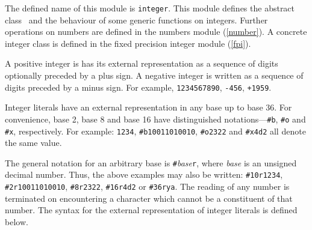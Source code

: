 \label{integer}
%
\begin{optDefinition}
The defined name of this module is {\tt integer}.  This module defines
the abstract class \ and the behaviour of some generic
functions on integers.  Further operations on numbers are defined in
the numbers module (\ref{number}).  A concrete integer class is
defined in the fixed precision integer module (\ref{fpi}).


A positive integer is has its
external representation as a sequence of digits optionally preceded by a plus
sign.  A negative integer is
written as a sequence of digits preceded by a minus sign.  For example,
\verb+1234567890+, \verb+-456+, \verb-+1959-.

Integer literals have an external representation in any base up to base
36.  For
convenience, base 2, base 8 and base
16 have
distinguished notations---\verb+#b+, \verb+#o+ and \verb+#x+, respectively.  For
example: \verb+1234+, \verb+#b10011010010+, \verb+#o2322+ and \verb+#x4d2+ all
denote the same value.

The general notation for an arbitrary base is
\verb+#+{\em base\/}\verb+r+, where {\em base\/} is an unsigned decimal number.
Thus, the above examples may also be written: \verb+#10r1234+,
\verb+#2r10011010010+, \verb+#8r2322+, \verb+#16r4d2+ or \verb+#36rya+.  The
reading of any number is terminated on encountering a character which cannot be
a constituent of that number.  The syntax for the external representation of
integer literals is defined below.


\end{optDefinition}
